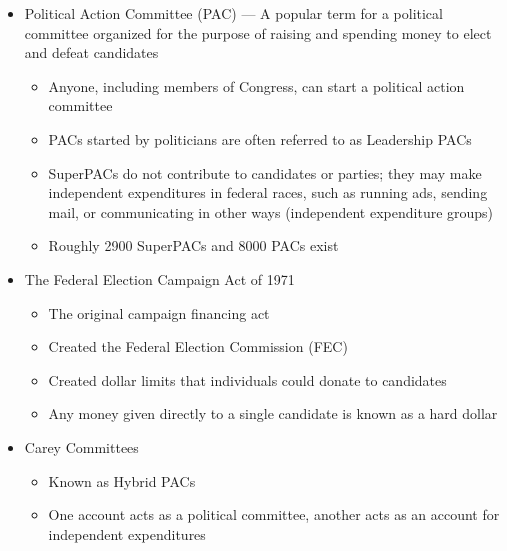 \documentclass[12pt]{article}
\begin{document}
\begin{itemize}
  \item Political Action Committee (PAC) — A popular term for a political committee organized for the purpose of raising and spending money to elect and defeat candidates

    \begin{itemize}

      \item Anyone, including members of Congress, can start a political action committee

      \item PACs started by politicians are often referred to as Leadership PACs

      \item SuperPACs do not contribute to candidates or parties; they may make independent expenditures in federal races, such as running ads, sending mail, or communicating in other ways (independent expenditure groups)

      \item Roughly 2900 SuperPACs and 8000 PACs exist

    \end{itemize}

  \item The Federal Election Campaign Act of 1971

    \begin{itemize}

      \item The original campaign financing act

      \item Created the Federal Election Commission (FEC)

      \item Created dollar limits that individuals could donate to candidates

      \item Any money given directly to a single candidate is known as a hard dollar

    \end{itemize}

  \item Carey Committees

    \begin{itemize}

      \item Known as Hybrid PACs

      \item One account acts as a political committee, another acts as an account for independent expenditures


\end{itemize}
\end{itemize}
\end{document}
